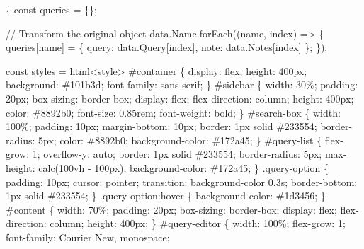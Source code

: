 \documentclass[
  letterpaper,
  DIV=11,
  numbers=noendperiod]{scrreprt}
\newenvironment{Shaded}{\begin{snugshade}}{\end{snugshade}}
\newcommand{\NormalTok}[1]{\textcolor[rgb]{0.00,0.23,0.31}{#1}}
\begin{document}
\begin{Shaded}
\begin{Highlighting}[]
\NormalTok{\{}
\NormalTok{  const queries = \{\};}

\NormalTok{// Transform the original object}
\NormalTok{    data.Name.forEach((name, index) =\textgreater{} \{}
\NormalTok{    queries[name] = \{}
\NormalTok{        query: data.Query[index],}
\NormalTok{        note: data.Notes[index]}
\NormalTok{    \};}
\NormalTok{    \});}

\NormalTok{  const styles = html\textasciigrave{}\textless{}style\textgreater{}}
\NormalTok{    \#container \{}
\NormalTok{      display: flex;}
\NormalTok{      height: 400px;}
\NormalTok{      background: \#101b3d;}
\NormalTok{      font{-}family: sans{-}serif;}
\NormalTok{    \}}
\NormalTok{    \#sidebar \{}
\NormalTok{      width: 30\%;}
\NormalTok{      padding: 20px;}
\NormalTok{      box{-}sizing: border{-}box;}
\NormalTok{      display: flex;}
\NormalTok{      flex{-}direction: column;}
\NormalTok{      height: 400px;}
\NormalTok{      color: \#8892b0;}
\NormalTok{      font{-}size: 0.85rem;}
\NormalTok{      font{-}weight: bold;}
\NormalTok{    \}}
\NormalTok{    \#search{-}box \{}
\NormalTok{      width: 100\%;}
\NormalTok{      padding: 10px;}
\NormalTok{      margin{-}bottom: 10px;}
\NormalTok{      border: 1px solid \#233554; }
\NormalTok{      border{-}radius: 5px;}
\NormalTok{      color: \#8892b0;}
\NormalTok{      background{-}color: \#172a45;}
\NormalTok{    \}}
\NormalTok{    \#query{-}list \{}
\NormalTok{      flex{-}grow: 1;}
\NormalTok{      overflow{-}y: auto;}
\NormalTok{      border: 1px solid \#233554;}
\NormalTok{      border{-}radius: 5px;}
\NormalTok{      max{-}height: calc(100vh {-} 100px);}
\NormalTok{      background{-}color: \#172a45;}
\NormalTok{    \}}
\NormalTok{    .query{-}option \{}
\NormalTok{      padding: 10px;}
\NormalTok{      cursor: pointer;}
\NormalTok{      transition: background{-}color 0.3s;}
\NormalTok{      border{-}bottom: 1px solid \#233554;}
\NormalTok{    \}}
\NormalTok{    .query{-}option:hover \{}
\NormalTok{      background{-}color: \#1d3456;}
\NormalTok{    \}}
\NormalTok{    \#content \{}
\NormalTok{      width: 70\%;}
\NormalTok{      padding: 20px;}
\NormalTok{      box{-}sizing: border{-}box;}
\NormalTok{      display: flex;}
\NormalTok{      flex{-}direction: column;}
\NormalTok{      height: 400px;}
\NormalTok{    \}}
\NormalTok{    \#query{-}editor \{}
\NormalTok{      width: 100\%;}
\NormalTok{      flex{-}grow: 1;}
\NormalTok{      font{-}family: \textquotesingle{}Courier New\textquotesingle{}, monospace;}

\end{Highlighting}
\end{Shaded}
\end{document}
